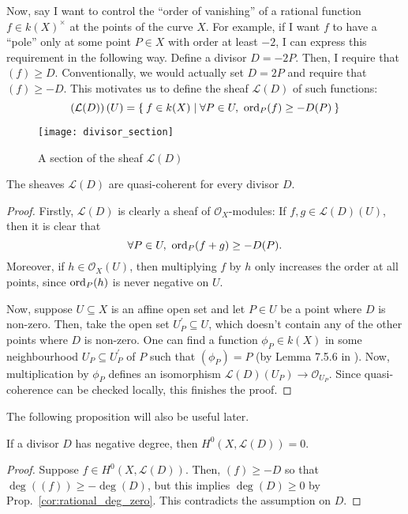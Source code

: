 Now, say I want to control the ``order of vanishing'' of a rational function
$f\in k(X)^{\times}$ at the points of the curve $X$. For example, if I want
$f$ to have a ``pole'' only at some point $P\in X$ with order at least $-2$,
I can express this requirement in the following way. Define a divisor
$D=-2P$. Then, I require that $(f)\geq D$. Conventionally, we would actually
set $D=2P$ and require that $(f)\geq -D$. This motivates us to define the
sheaf $\mathcal{L}(D)$ of such functions:
\[
  \left(\mathcal{L}(D)\right)(U)=\Set{f\in k(X)\mid
  \forall P\in U,\ \operatorname{ord}_{P}(f)\geq -D(P)}
\]
\begin{figure}[H]
  \centering
  \texttt{[image: divisor\_section]}
  \caption{A section of the sheaf $\mathcal{L}(D)$}
\end{figure}
\begin{prop}
  The sheaves $\mathcal{L}(D)$ are quasi-coherent for every divisor $D$.
\end{prop}
\begin{proof}
  Firstly, $\mathcal{L}(D)$ is clearly a sheaf of $\mathscr{O}_{X}$-modules:
  If $f, g\in\mathcal{L}(D)(U)$, then it is clear that
  \[
    \forall P\in U,\ \ord_{P}(f+g)\geq -D(P).
  \]
  Moreover, if $h\in\mathscr{O}_{X}(U)$, then multiplying $f$ by $h$ only
  increases the order at all points, since $\operatorname{ord}_{P}(h)$ is never negative
  on $U$.

  Now, suppose $U\subseteq X$ is an affine open set and let $P\in U$ be a
  point where $D$ is non-zero. Then, take the open set
  $U_{P}^{\prime}\subseteq U$, which doesn't contain any of the other points
  where $D$ is non-zero. One can find a function $\phi_{P}\in k(X)$ in some
  neighbourhood $U_{P}\subseteq U_{P}^{\prime}$ of $P$ such that $(\phi_{P})=P$
  (by Lemma 7.5.6 in \cite{gathmann}). Now, multiplication by $\phi_{P}$
  defines an isomorphism $\mathcal{L}(D)(U_{P})\to \mathscr{O}_{U_{P}}$.
  Since quasi-coherence can be checked locally, this finishes the proof.
\end{proof}
The following proposition will also be useful later.
\begin{prop}\label{prop:global_sec_negative_divisor}
  If a divisor $D$ has negative degree, then $H^{0}(X,\mathcal{L}(D))=0$.
\end{prop}
\begin{proof}
  Suppose $f\in H^{0}(X,\mathcal{L}(D))$. Then, $(f)\geq -D$
  so that $\deg((f))\geq -\deg(D)$, but this implies $\deg(D)\geq 0$
  by Prop.~\ref{cor:rational_deg_zero}. This contradicts the assumption on
  $D$.
\end{proof}

